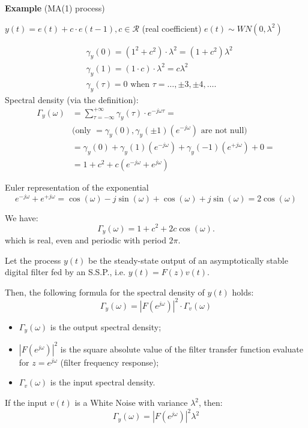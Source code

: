 \textbf{Example} (MA(1) process)

$y(t)=e(t)+c \cdot e(t-1), c \in \mathcal{R}$ (real coefficient)
$e(t)\sim W N(0,\lambda^{2} )$

\begin{align*}
	&\gamma_{y}(0)=\left(1^{2}+c^{2}\right) \cdot \lambda^{2}=(1+c^{2})\lambda^{2}\\
	&\gamma_{y}(1)=(1 \cdot c) \cdot \lambda^{2}=c\lambda^{2} \\
	&\gamma_{y}(\tau)=0 \text { when } \tau=\ldots, \pm 3, \pm 4, \ldots .
\end{align*}
Spectral density (via the definition):
\begin{align*}
	\Gamma_{y}(\omega)&=\sum_{\tau=-\infty}^{+\infty} \gamma_{y}(\tau) \cdot e^{-j \omega \tau}= \\
	&\text{(only $=\gamma_{y}(0), \gamma_{y}(\pm 1)\left(e^{-j \omega}\right)$ are not null)} \\
	&=\gamma_{y}(0)+\gamma_{y}(1)\left(e^{-j \omega}\right)+\gamma_{y}(-1)\left(e^{+j \omega}\right)+0= \\
	&=1+c^{2}+c\left(e^{-j \omega}+e^{j \omega}\right)
\end{align*}

Euler representation of the exponential
$$
e^{-j \omega}+e^{+j \omega}=\cos (\omega)-j \sin (\omega)+\cos (\omega)+j \sin (\omega)=2 \cos (\omega)
$$

We have:
$$\Gamma_y(\omega)=1+c^{2}+2 c \cos (\omega).$$
which is real, even and periodic with period $2 \pi$.

Let the process $y(t)$ be the steady-state output of an asymptotically stable digital filter fed by an S.S.P., i.e. $y(t)=F(z) v(t)$.

Then, the following formula for the spectral density of $y(t)$ holds:
$$\Gamma_{y}(\omega)=|F\left(e^{j \omega}\right)|^{2} \cdot \Gamma_{v}(\omega)$$

\begin{itemize}
	\item $\Gamma_{y}(\omega)$ is the output spectral density;
	\item $\left|F\left(e^{j \omega}\right)\right|^{2}$ is the square absolute value of the filter transfer function evaluate for $z=e^{j \omega}$ (filter frequency response);
	\item $\Gamma_{v}(\omega)$ is the input spectral density.
\end{itemize}

If the input $v(t)$ is a White Noise with variance $\lambda^{2}$, then:
$$
\Gamma_{y}(\omega)=\left|F\left(e^{j \omega}\right)\right|^{2} \lambda^{2}
$$

